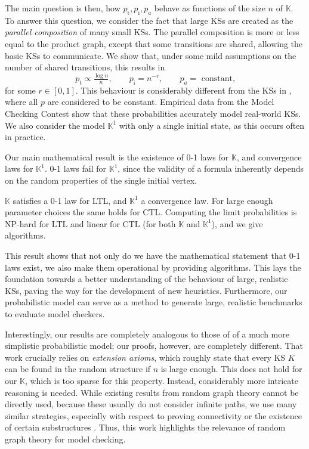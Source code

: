 \documentclass[runngingheads]{llncs}
\newcommand\recht\operatorname
\begin{document}
The main question is then, how $p_{\recht{t}},p_{\recht{i}},p_a$ behave as functions of the size $n$ of $\mathbb{K}$. To answer this question, we consider the fact that large KSs are created as the \emph{parallel composition} of many small KSs. The parallel composition is more or less equal to the product graph, except that some transitions are shared, allowing the basic KSs to communicate. We show that, under some mild assumptions on the number of shared transitions, this results in 
\[
p_{\recht{t}} \propto \tfrac{\log n}{n}, \quad \quad p_{\recht{i}} = n^{-r},\quad \quad  p_{a} = \textrm{ constant,}
\]
for some $r \in [0,1]$. This behaviour is considerably different from the KSs in \cite{dong20250}, where all $p$ are considered to be constant. Empirical data from the Model Checking Contest \cite{amat2023behind} show that these probabilities accurately model real-world KSs. We also consider the model $\mathbb{K}^1$ with only a single initial state, as this occurs often in practice.

Our main mathematical result is the existence of 0-1 laws for $\mathbb{K}$, and convergence laws for $\mathbb{K}^1$. 0-1 laws fail for $\mathbb{K}^1$, since the validity of a formula inherently depends on the random properties of the single initial vertex.

\begin{theorem} $\mathbb{K}$ satisfies a 0-1 law for LTL, and $\mathbb{K}^1$ a convergence law. For large enough parameter choices the same holds for CTL. Computing the limit probabilities is NP-hard for LTL and linear for CTL (for both $\mathbb{K}$ and $\mathbb{K}^1$), and we give algorithms.
\end{theorem}

This result shows that not only do we have the mathematical statement that 0-1 laws exist, we also make them operational by providing algorithms. This lays the foundation towards a better understanding of the behaviour of large, realistic KSs, paving the way for the development of new heuristics. Furthermore, our probabilistic model can serve as a method to generate large, realistic benchmarks to evaluate model checkers.

Interestingly, our results are completely analogous to those of \cite{dong20250} of a much more simplistic probabilistic model; our proofs, however, are completely different. That work crucially relies on \emph{extension axioms}, which roughly state that every KS $K$ can be found in the random structure if $n$ is large enough. This does not hold for our $\mathbb{K}$, which is too sparse for this property. Instead, considerably more intricate reasoning is needed. While existing results from random graph theory cannot be directly used, because these usually do not consider infinite paths, we use many similar strategies, especially with respect to proving connectivity or the existence of certain substructures \cite{hofstad2017random}. Thus, this work highlights the relevance of random graph theory for model checking.
\end{document}
